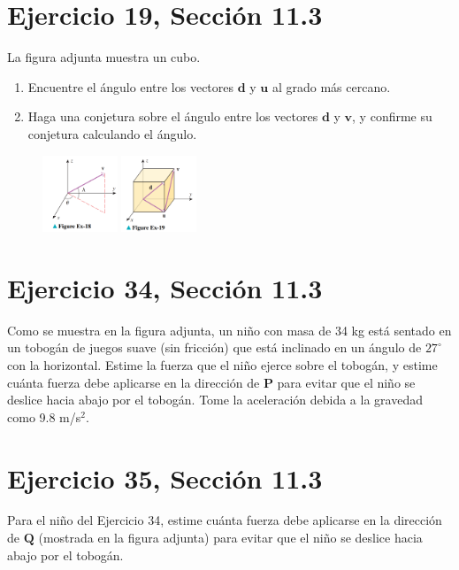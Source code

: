 \documentclass[11pt,letterpaper]{article}
\begin{document}
\section{Ejercicio 19, Sección 11.3}
La figura adjunta muestra un cubo.
\begin{enumerate}
    \item Encuentre el ángulo entre los vectores $\mathbf{d}$ y $\mathbf{u}$ al grado más cercano.
    \item Haga una conjetura sobre el ángulo entre los vectores $\mathbf{d}$ y $\mathbf{v}$, y confirme su conjetura calculando el ángulo.
\end{enumerate}

\begin{figure}[h]
    \centering
    \includegraphics[width=0.2\textwidth]{imagenes/Figure_Ex-18.png}
    \hspace{5cm}
    \includegraphics[width=0.2\textwidth]{imagenes/Figure_Ex-19.png}
\end{figure}


\section{Ejercicio 34, Sección 11.3}
Como se muestra en la figura adjunta, un niño con masa de 34 kg está sentado en un tobogán de juegos suave (sin fricción) que está inclinado en un ángulo de $27^\circ$ con la horizontal. Estime la fuerza que el niño ejerce sobre el tobogán, y estime cuánta fuerza debe aplicarse en la dirección de $\mathbf{P}$ para evitar que el niño se deslice hacia abajo por el tobogán. Tome la aceleración debida a la gravedad como 9.8 m/s$^2$.


\section{Ejercicio 35, Sección 11.3}
Para el niño del Ejercicio 34, estime cuánta fuerza debe aplicarse en la dirección de $\mathbf{Q}$ (mostrada en la figura adjunta) para evitar que el niño se deslice hacia abajo por el tobogán.
\end{document}
